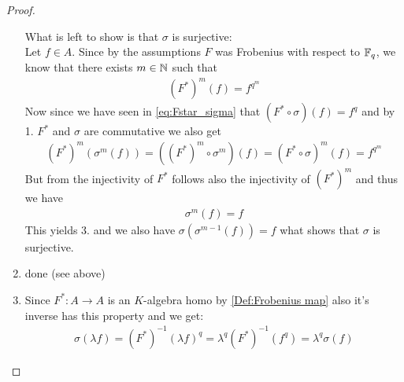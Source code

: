 \documentclass[]{article}
\begin{document}
\begin{proof}
\begin{enumerate}
        What is left to show is that \(\sigma\) is surjective: \\
        Let \(f \in A\). Since by the assumptions \(F\) was Frobenius with respect to \({\mathbb{F}}_q\), 
        we know that there exists \(m \in {\mathbb{N}}\) such that
        \begin{align*}
            (F^*)^m(f)=f^{q^m}
        \end{align*}
        Now since we have seen in \eqref{eq:Fstar_sigma} that \((F^* \circ \sigma)(f)=f^q\) and by 1. \(F^*\) and \(\sigma\) are commutative 
        we also get
        \begin{align*}
            (F^*)^m(\sigma^m(f))= ((F^*)^m \circ \sigma^m)(f) = (F^* \circ \sigma)^m(f) = f^{q^m}
        \end{align*}
        But from the injectivity of \(F^*\) follows also the injectivity of \((F^*)^m\) and thus we have
        \begin{align*}
            \sigma^m(f)=f
        \end{align*}
        This yields 3. and we also have \(\sigma(\sigma^{m-1}(f))=f\) what shows that \(\sigma\) is surjective.
        \item done (see above)
        \item Since \(F^*:A \rightarrow A\) is an \(K\)-algebra homo by \ref{Def:Frobenius map} also it's inverse has this property and we get:
        \begin{align*}
            \sigma(\lambda f) = (F^*)^{-1}(\lambda f)^q = \lambda^q (F^*)^{-1}(f^q) = \lambda^q \sigma(f)
        \end{align*}
    \end{enumerate}
\end{proof}
\end{document}
